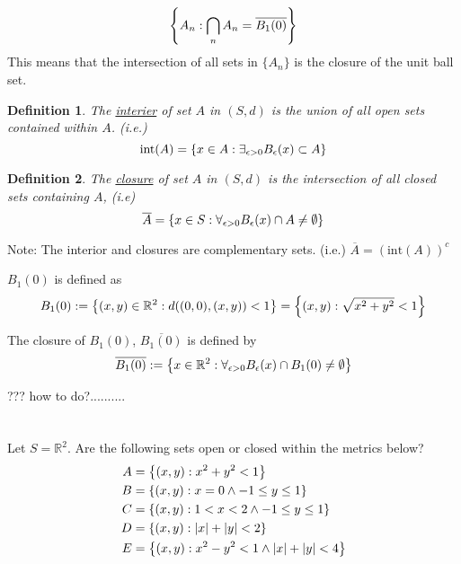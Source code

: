 \documentclass[]{article}
\newcommand{\R}{\mathbb{R}}
\newtheorem{definition}{Definition}
\begin{document}
$$\qty{A_n : \bigcap_n A_n = \overline{B_1(0)}}$$
This means that the intersection of all sets in $\{A_n\}$ 
is the closure of the unit ball set.

\begin{definition}
    The \underline{interier} of set $A$ in $(S,d)$ is the union of all open sets 
    contained within $A$. (i.e.)
    $$\text{int}(A) = \qty{x \in A : \exists_{\epsilon>0} B_\epsilon(x) \subset A}$$
\end{definition}

\begin{definition}
    The \underline{closure} of set $A$ in $(S,d)$ is the intersection of all closed sets 
    containing $A$, (i.e) 
    $$\overline{A} = \qty{x \in S : 
        \forall_{\epsilon> 0} B_\epsilon(x) \cap A \neq \emptyset}$$
\end{definition}
Note: 
The interior and closures are complementary sets. (i.e.) $\overline{A} = (\text{int}(A))^c$


$B_1(0)$ is defined as 
$$B_1(0) := \qty{(x,y) \in \R^2 : d((0,0),(x,y)) < 1} = \qty{(x,y) : \sqrt{x^2 + y^2} < 1}$$

The closure of $B_1(0)$, $\overline{B_1(0)}$ is defined by 
$$\overline{B_1(0)} := \qty{x \in \R^2 : 
    \forall_{\epsilon> 0} B_\epsilon(x) \cap B_1(0) \neq \emptyset}$$


??? how to do?..........

















\newpage
\section{}
Let $S = \R^2$. Are the following sets open or closed within the metrics below?
\begin{align*}
    A &= \qty{(x,y) : x^2 + y^2 < 1}\\
    B &= \qty{(x,y) : x = 0 \land -1 \leq y \leq 1}\\
    C &= \qty{(x,y) : 1 < x < 2 \land -1 \leq y \leq 1}\\
    D &= \qty{(x,y) : \abs{x} + \abs{y} < 2}\\
    E &= \qty{(x,y) : x^2 - y^2 < 1 \land \abs{x} + \abs{y} < 4}
\end{align*}
\end{document}
